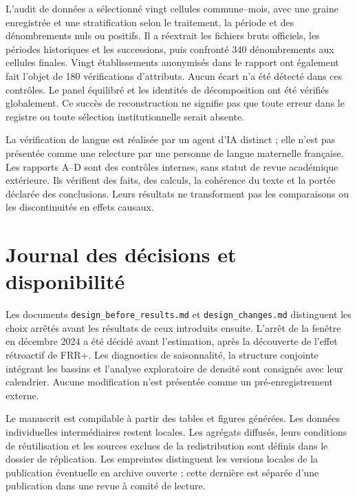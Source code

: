 L’audit de données a sélectionné vingt cellules commune–mois, avec une graine enregistrée et une stratification selon le traitement, la période et des dénombrements nuls ou positifs. Il a réextrait les fichiers bruts officiels, les périodes historiques et les successions, puis confronté 340 dénombrements aux cellules finales. Vingt établissements anonymisés dans le rapport ont également fait l’objet de 180 vérifications d’attributs. Aucun écart n’a été détecté dans ces contrôles. Le panel équilibré et les identités de décomposition ont été vérifiés globalement. Ce succès de reconstruction ne signifie pas que toute erreur dans le registre ou toute sélection institutionnelle serait absente.

La vérification de langue est réalisée par un agent d’IA distinct ; elle n’est pas présentée comme une relecture par une personne de langue maternelle française. Les rapports A–D sont des contrôles internes, sans statut de revue académique extérieure. Ils vérifient des faits, des calculs, la cohérence du texte et la portée déclarée des conclusions. Leurs résultats ne transforment pas les comparaisons ou les discontinuités en effets causaux.

\section{Journal des décisions et disponibilité}
Les documents \texttt{design\_before\_results.md} et \texttt{design\_changes.md} distinguent les choix arrêtés avant les résultats de ceux introduits ensuite. L’arrêt de la fenêtre en décembre 2024 a été décidé avant l’estimation, après la découverte de l’effet rétroactif de FRR+. Les diagnostics de saisonnalité, la structure conjointe intégrant les bassins et l’analyse exploratoire de densité sont consignés avec leur calendrier. Aucune modification n’est présentée comme un pré-enregistrement externe.

Le manuscrit est compilable à partir des tables et figures générées. Les données individuelles intermédiaires restent locales. Les agrégats diffusés, leurs conditions de réutilisation et les sources exclues de la redistribution sont définis dans le dossier de réplication. Les empreintes distinguent les versions locales de la publication éventuelle en archive ouverte ; cette dernière est séparée d’une publication dans une revue à comité de lecture.

